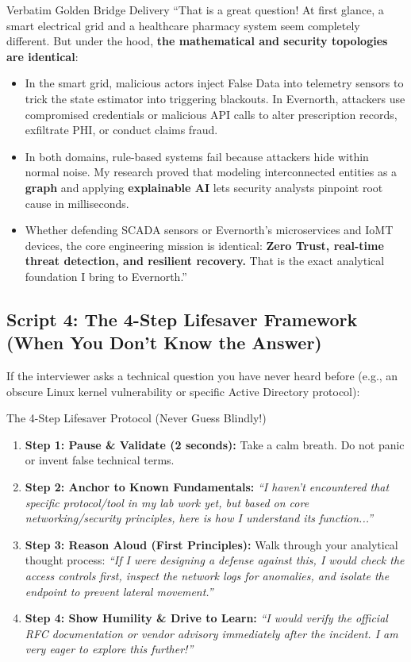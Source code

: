 \documentclass[10pt,a4paper]{article}
\begin{document}
\begin{scriptbox}{Verbatim Golden Bridge Delivery}
``That is a great question! At first glance, a smart electrical grid and a healthcare pharmacy system seem completely different. But under the hood, \textbf{the mathematical and security topologies are identical}:
\begin{itemize}[noitemsep]
    \item In the smart grid, malicious actors inject False Data into telemetry sensors to trick the state estimator into triggering blackouts. In Evernorth, attackers use compromised credentials or malicious API calls to alter prescription records, exfiltrate PHI, or conduct claims fraud.
    \item In both domains, rule-based systems fail because attackers hide within normal noise. My research proved that modeling interconnected entities as a \textbf{graph} and applying \textbf{explainable AI} lets security analysts pinpoint root cause in milliseconds.
    \item Whether defending SCADA sensors or Evernorth's microservices and IoMT devices, the core engineering mission is identical: \textbf{Zero Trust, real-time threat detection, and resilient recovery.} That is the exact analytical foundation I bring to Evernorth.''
\end{itemize}
\end{scriptbox}

\subsection{Script 4: The 4-Step Lifesaver Framework (When You Don't Know the Answer)}
If the interviewer asks a technical question you have never heard before (e.g., an obscure Linux kernel vulnerability or specific Active Directory protocol):

\begin{alertbox}{The 4-Step Lifesaver Protocol (Never Guess Blindly!)}
\begin{enumerate}
    \item \textbf{Step 1: Pause \& Validate (2 seconds):} Take a calm breath. Do not panic or invent false technical terms.
    \item \textbf{Step 2: Anchor to Known Fundamentals:} \textit{``I haven't encountered that specific protocol/tool in my lab work yet, but based on core networking/security principles, here is how I understand its function...''}
    \item \textbf{Step 3: Reason Aloud (First Principles):} Walk through your analytical thought process: \textit{``If I were designing a defense against this, I would check the access controls first, inspect the network logs for anomalies, and isolate the endpoint to prevent lateral movement.''}
    \item \textbf{Step 4: Show Humility \& Drive to Learn:} \textit{``I would verify the official RFC documentation or vendor advisory immediately after the incident. I am very eager to explore this further!''}
\end{enumerate}
\end{alertbox}
\end{document}
